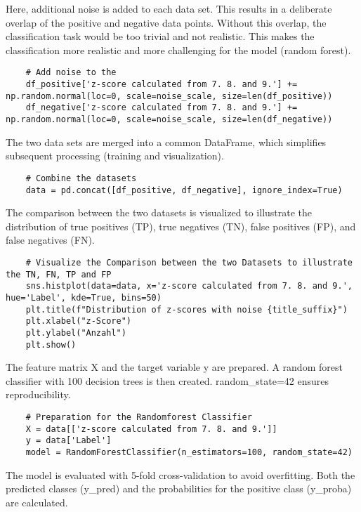 \documentclass{article}
\begin{document}
\begin{large}
\begin{large}
\begin{large}
Here, additional noise is added to each data set. This results in a deliberate overlap of the positive and negative data points. Without this overlap, the classification task would be too trivial and not realistic. This makes the classification more realistic and more challenging for the model (random forest).
\begin{lstlisting}
    # Add noise to the 
    df_positive['z-score calculated from 7. 8. and 9.'] += np.random.normal(loc=0, scale=noise_scale, size=len(df_positive))
    df_negative['z-score calculated from 7. 8. and 9.'] += np.random.normal(loc=0, scale=noise_scale, size=len(df_negative))
\end{lstlisting}\par
\vspace{1em}

The two data sets are merged into a common DataFrame, which simplifies subsequent processing (training and visualization).
\begin{lstlisting}
    # Combine the datasets 
    data = pd.concat([df_positive, df_negative], ignore_index=True)
\end{lstlisting}\par
\vspace{1em}

The comparison between the two datasets is visualized to illustrate the distribution of true positives (TP), true negatives (TN), false positives (FP), and false negatives (FN).

\begin{lstlisting}
    # Visualize the Comparison between the two Datasets to illustrate the TN, FN, TP and FP
    sns.histplot(data=data, x='z-score calculated from 7. 8. and 9.', hue='Label', kde=True, bins=50)
    plt.title(f"Distribution of z-scores with noise {title_suffix}")
    plt.xlabel("z-Score")
    plt.ylabel("Anzahl")
    plt.show()
\end{lstlisting}\par
\vspace{1em}
The feature matrix X and the target variable y are prepared. A random forest classifier with 100 decision trees is then created. random_state=42 ensures reproducibility.

\begin{lstlisting}
    # Preparation for the Randomforest Classifier
    X = data[['z-score calculated from 7. 8. and 9.']]
    y = data['Label']
    model = RandomForestClassifier(n_estimators=100, random_state=42)
\end{lstlisting}\par
\vspace{1em}
The model is evaluated with 5-fold cross-validation to avoid overfitting. Both the predicted classes (y_pred) and the probabilities for the positive class (y_proba) are calculated.


\end{large}
\end{large}
\end{large}
\end{document}
